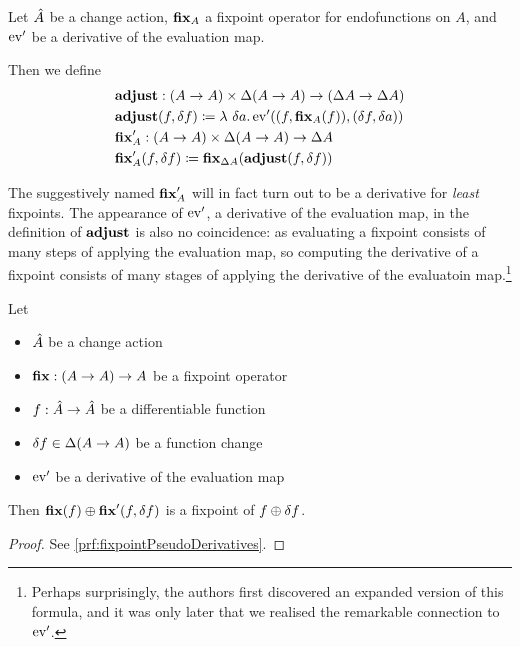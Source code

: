 \begin{defn}
\label{def:fixpointDerivatives}
  Let $\hat{A}$ be a change action, $\mathbf{fix}_A$ a fixpoint operator for
  endofunctions on $A$, and $\operatorname{ev}'$ be a derivative of the evaluation map.
  
  Then we define
  \begin{align*}
    &\mathbf{adjust} : (A \rightarrow A) \times \Delta (A \rightarrow A) \rightarrow (\Delta A \rightarrow \Delta A)\\
    &\mathbf{adjust}(f, \delta f) \coloneqq \lambda\ \delta a . \operatorname{ev}'((f, \mathbf{fix}_A(f)), (\delta f, \delta a))\\
    &\mathbf{fix}_A' : (A \rightarrow A) \times \Delta (A \rightarrow A) \rightarrow \Delta A\\
    &\mathbf{fix}_A'(f, \delta f) \coloneqq \mathbf{fix}_{\Delta A}(\mathbf{adjust}(f, \delta f))
  \end{align*}
\end{defn}

The suggestively named $\mathbf{fix}_A'$ will in fact turn out to be a
derivative \textemdash{} for \emph{least} fixpoints. The appearance of
$\operatorname{ev}'$, a derivative of the evaluation map, in the definition of
$\mathbf{adjust}$ is also no coincidence: as evaluating a fixpoint consists of many
steps of applying the evaluation map, so computing the derivative of a fixpoint
consists of many stages of applying the derivative of the evaluatoin
map.\footnote{Perhaps surprisingly, the authors first discovered an expanded
  version of this formula, and it was only later that we realised the remarkable
  connection to $\operatorname{ev}'$.}

\begin{thm}[name=Pseudo-derivatives of fixpoints, restate=fixpointPseudoDerivatives]
\label{thm:fixpointPseudoDerivatives}
  Let
  \begin{itemize}
    \item $\hat{A}$ be a change action
    \item $\mathbf{fix} : (A \rightarrow A) \rightarrow A$ be a fixpoint operator
    \item $f: \hat{A} \rightarrow \hat{A}$ be a differentiable function
    \item $\delta f \in \Delta (A \rightarrow A)$ be a function change 
    \item $\operatorname{ev}'$ be a derivative of the evaluation map
  \end{itemize}
  Then $\mathbf{fix}(f) \oplus \mathbf{fix}'(f, \delta f)$ is a fixpoint
  of $f \oplus \delta f$.
\end{thm}
\ifproofs
\begin{proof}
  See \cref{prf:fixpointPseudoDerivatives}.
\end{proof}
\fi

